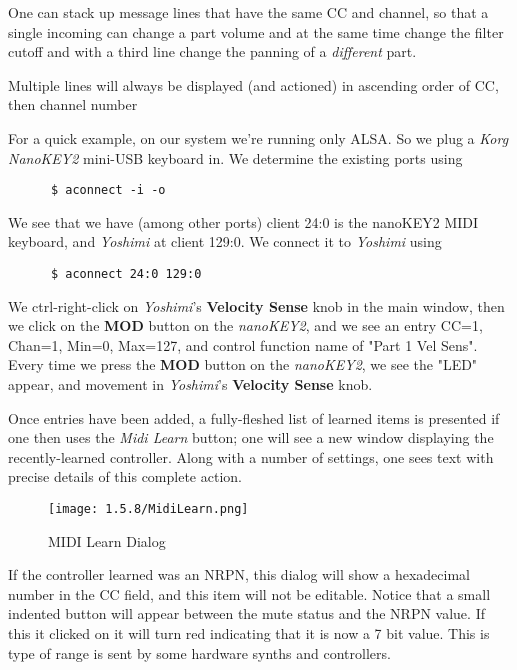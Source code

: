    One can stack up message lines that have the same CC and channel, so that a
   single incoming can change a part volume and at the same time change the
   filter cutoff and with a third line change the panning of a
   \textsl{different} part.

   Multiple lines will always be displayed (and actioned) in ascending order of
   CC, then channel number

   For a quick example, on our system we're running only ALSA.  So we
   plug a \textsl{Korg NanoKEY2} mini-USB keyboard in.
   We determine the existing ports using

   \begin{verbatim}
      $ aconnect -i -o
   \end{verbatim}

   We see that we have (among other ports) client 24:0 is the nanoKEY2 MIDI
   keyboard, and \textsl{Yoshimi} at client 129:0.
   We connect it to \textsl{Yoshimi} using

   \begin{verbatim}
      $ aconnect 24:0 129:0
   \end{verbatim}

   We ctrl-right-click on \textsl{Yoshimi}'s \textbf{Velocity Sense} knob in
   the main window, then we click on the \textbf{MOD} button on the
   \textsl{nanoKEY2}, and we see an entry CC=1, Chan=1, Min=0, Max=127, and
   control function name of "Part 1 Vel Sens".  Every time we press the
   \textbf{MOD} button on the \textsl{nanoKEY2}, we see the "LED" appear, and
   movement in \textsl{Yoshimi}'s \textbf{Velocity Sense} knob.

   Once entries have been added, a fully-fleshed list of learned items is
   presented if one then uses the \textsl{Midi Learn} button; one will
   see a new window displaying the recently-learned controller. Along with a
   number of settings, one sees text with precise details of this complete
   action.

\begin{figure}[H]
   \centering
   \texttt{[image: 1.5.8/MidiLearn.png]}
   \caption{MIDI Learn Dialog}
   \label{fig:midi_learn_dialog}
\end{figure}

   If the controller learned was an NRPN, this dialog will show a hexadecimal
   number in the CC field, and this item will not be editable. Notice that a small indented button will appear between the mute status and the NRPN value. If this it clicked on it will turn red indicating that it is now a 7 bit value. This is type of range is sent by some hardware synths and controllers.

